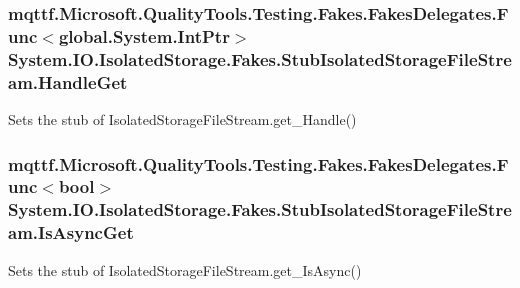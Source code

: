 \hypertarget{class_system_1_1_i_o_1_1_isolated_storage_1_1_fakes_1_1_stub_isolated_storage_file_stream_a58542ae10e292c8652e544857731eb1c}{
\subsubsection[{Handle\-Get}]{\setlength{\rightskip}{0pt plus 5cm}mqttf.\-Microsoft.\-Quality\-Tools.\-Testing.\-Fakes.\-Fakes\-Delegates.\-Func$<$global.\-System.\-Int\-Ptr$>$ System.\-I\-O.\-Isolated\-Storage.\-Fakes.\-Stub\-Isolated\-Storage\-File\-Stream.\-Handle\-Get}}\label{class_system_1_1_i_o_1_1_isolated_storage_1_1_fakes_1_1_stub_isolated_storage_file_stream_a58542ae10e292c8652e544857731eb1c}


Sets the stub of Isolated\-Storage\-File\-Stream.\-get\-\_\-\-Handle()

\hypertarget{class_system_1_1_i_o_1_1_isolated_storage_1_1_fakes_1_1_stub_isolated_storage_file_stream_a8754a83e31d04aec9abff8825a748b49}{
\subsubsection[{Is\-Async\-Get}]{\setlength{\rightskip}{0pt plus 5cm}mqttf.\-Microsoft.\-Quality\-Tools.\-Testing.\-Fakes.\-Fakes\-Delegates.\-Func$<$bool$>$ System.\-I\-O.\-Isolated\-Storage.\-Fakes.\-Stub\-Isolated\-Storage\-File\-Stream.\-Is\-Async\-Get}}\label{class_system_1_1_i_o_1_1_isolated_storage_1_1_fakes_1_1_stub_isolated_storage_file_stream_a8754a83e31d04aec9abff8825a748b49}


Sets the stub of Isolated\-Storage\-File\-Stream.\-get\-\_\-\-Is\-Async()

